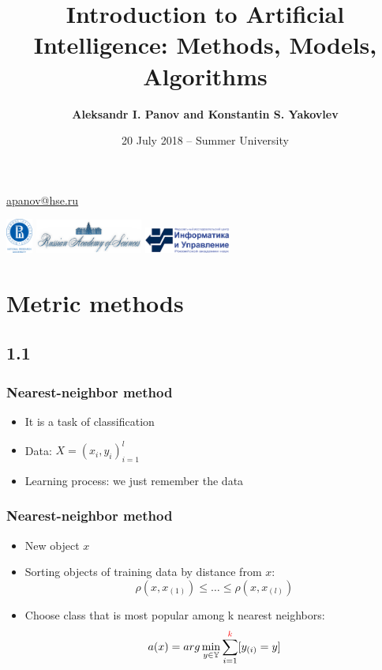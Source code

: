 \documentclass[default]{beamer}
\begin{document}
	
	\title[Introduction to AI]{Introduction to Artificial Intelligence: Methods, Models, Algorithms}
	\author[Panov]{\textbf{Aleksandr I. Panov and Konstantin S. Yakovlev}}
	\date{20 July 2018 -- Summer University} 
	
	{
	\begin{frame}
		
		\titlepage
		\centering
		\href{mailto:apanov@hse.ru}{apanov@hse.ru}
		
		\includegraphics[width=25pt]{hse.png} \hspace{10pt}
		\includegraphics[width=100pt]{ras_en.png} \hspace{10pt}
		\includegraphics[width=80pt]{frccsc.png}
		
	\end{frame}
	}	

	\section{Metric methods}
	\subsection{1.1}
	\begin{frame}
		\frametitle{Nearest-neighbor method}

		\begin{itemize}
			\item It is a task of classification
			\item Data: $X=(x_i, y_i)^l_{i=1}$
			\item Learning process: we just remember the data
		\end{itemize}
	\end{frame}

	\begin{frame}
		\frametitle{Nearest-neighbor method}
		
		\begin{itemize}
			\item New object $x$
			\item Sorting objects of training data by distance from $x$:
				\[
					\rho(x,x_{(1)})\leq \dots \leq \rho(x, x_{(l)})
				\]
			\item Choose class that is most popular among k nearest neighbors:
			\[
				a(x)=arg\min_{y\in\mathbb Y}\sum_{i=1}^{\textcolor{red}{k}}[y_{(i)}=y]
			\]
				
		\end{itemize}
	\end{frame}
\end{document}
